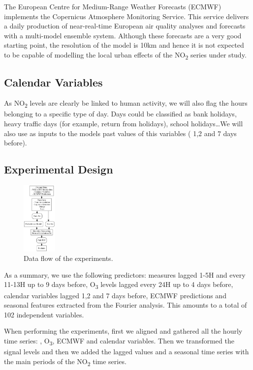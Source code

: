 \documentclass[a4paper,twocolumn,5p]{elsarticle}
\begin{document}
The European Centre for Medium-Range Weather Forecasts (ECMWF)
implements the Copernicus Atmosphere Monitoring Service.  This service
delivers a daily production of near-real-time European air quality
analyses and forecasts with a multi-model ensemble system. Although
these forecasts are a very good starting point, 
the resolution of the model is 10km
and hence it is not expected to be capable of modelling the local
urban effects of the NO\textsubscript{2} series under study.

\subsection{Calendar Variables}
\label{sec:cal_data}

As NO\textsubscript{2} levels are clearly be linked to human activity,
we will also flag the hours belonging to a specific type of day. Days
could be classified as bank holidays, heavy traffic days (for example,
return from holidays), school holidays\ldots We will also use as
inputs to the models past values of this variables ( 1,2 and 7 days
before).

\subsection{Experimental Design}
\label{sec:experimental-design}

\begin{figure}
  \centering
  \includegraphics[width=0.15\textwidth]{diagrams/flow}
  \caption{\label{figure:dataflow}Data flow of the
    experiments.}
\end{figure}

As a summary, we use the following predictors: \no
measures lagged 1-5H and every 11-13H up to 9 days before,
O\textsubscript{3} levels lagged every 24H up to 4 days before, 
calendar variables lagged 1,2 and 7 days before,
 ECMWF predictions and seasonal features extracted
from the Fourier analysis. This amounts to a total of 102 independent
variables. 

When performing the experiments, first we aligned and gathered all the
hourly time series: \no, O\textsubscript{3}, ECMWF and
calendar variables.  Then we transformed the signal levels and then we
added the lagged values and a seasonal time series with the main
periods of the NO\textsubscript{2} time series.
\end{document}
